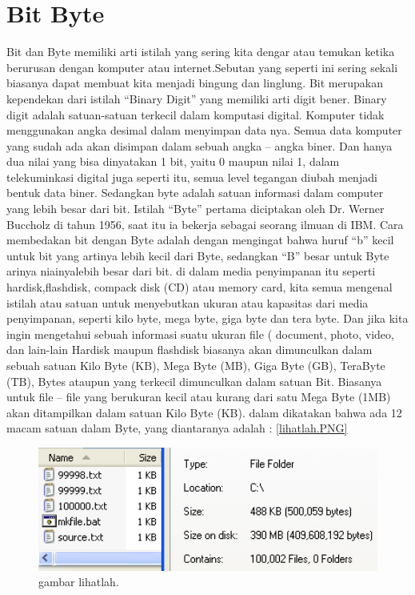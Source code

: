 ﻿%

\section {Bit Byte}
Bit dan Byte memiliki arti istilah yang sering kita dengar atau temukan ketika berurusan dengan komputer atau internet.Sebutan yang seperti ini sering sekali biasanya dapat membuat kita menjadi bingung dan linglung. Bit merupakan kependekan dari istilah “Binary Digit” yang memiliki arti digit bener.
Binary digit adalah satuan-satuan terkecil dalam komputasi digital. Komputer tidak menggunakan angka desimal  dalam menyimpan data nya. Semua data komputer yang sudah ada akan disimpan dalam sebuah angka – angka biner. Dan hanya dua nilai yang bisa dinyatakan 1 bit, yaitu 0 maupun nilai 1, dalam telekuminkasi digital juga seperti itu, semua level tegangan diubah menjadi bentuk data biner.
Sedangkan byte adalah satuan informasi dalam computer yang lebih besar dari bit. Istilah “Byte” pertama diciptakan oleh Dr. Werner Buccholz di tahun 1956, saat itu ia bekerja sebagai seorang ilmuan di IBM. 
Cara membedakan bit dengan Byte adalah dengan mengingat bahwa  huruf “b” kecil untuk bit yang artinya lebih kecil dari Byte, sedangkan “B” besar untuk Byte arinya niainyalebih besar dari bit.
di dalam media penyimpanan itu seperti hardisk,flashdisk, compack disk (CD) atau memory card, kita semua mengenal istilah atau satuan untuk menyebutkan ukuran atau kapasitas dari media penyimpanan, seperti kilo byte, mega byte, giga byte dan tera byte. Dan jika kita ingin mengetahui sebuah informasi suatu ukuran file ( document, photo, video, dan lain-lain
Hardisk maupun flashdisk biasanya akan dimunculkan dalam sebuah satuan Kilo Byte (KB), Mega Byte (MB), Giga Byte (GB), TeraByte (TB), Bytes ataupun yang terkecil dimunculkan dalam satuan Bit. Biasanya untuk file – file yang berukuran kecil atau kurang dari satu Mega Byte (1MB) akan ditampilkan dalam satuan Kilo Byte (KB).
dalam \cite{tucker2012bit} dikatakan bahwa ada 12 macam satuan dalam Byte, yang diantaranya adalah :
\ref{lihatlah.PNG}
\begin{figure}[ht]
\centerline{\includegraphics[width=1\textwidth]{figures/lihatlah.png}}
\caption{gambar lihatlah.}
\label{lihatlah.png}
\end{figure}

